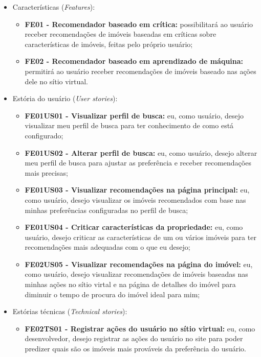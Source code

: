 \begin{itemize}
    \item Características (\textit{Features}):
    \begin{itemize}
        \item \textbf{FE01 - Recomendador baseado em crítica:} possibilitará ao usuário receber recomendações de imóveis baseadas em críticas sobre características de imóveis, feitas pelo próprio usuário;

        \item \textbf{FE02 - Recomendador baseado em aprendizado de máquina:} permitirá ao usuário receber recomendações de imóveis baseado nas ações dele no sítio virtual.
    \end{itemize}
    
    \item Estória do usuário (\textit{User stories}):
    \begin{itemize}
        \item \textbf{FE01US01 - Visualizar perfil de busca:} eu, como usuário, desejo visualizar meu perfil de busca para ter conhecimento de como está configurado;
        
        \item \textbf{FE01US02 - Alterar perfil de busca:} eu, como usuário, desejo alterar meu perfil de busca para ajustar as preferência e receber recomendações mais precisas;
        
        \item \textbf{FE01US03 - Visualizar recomendações na página principal:} eu, como usuário, desejo visualizar os imóveis recomendados com base nas minhas preferências configuradas no perfil de busca;
        
        \item \textbf{FE01US04 - Criticar características da propriedade:} eu, como usuário, desejo criticar as características de um ou vários imóveis para ter recomendações mais adequadas com o que eu desejo;
        
        \item \textbf{FE02US05 - Visualizar recomendações na página do imóvel:} eu, como usuário, desejo visualizar recomendações de imóveis baseadas nas minhas ações no sítio virtal e na página de detalhes do imóvel para diminuir o tempo de procura do imóvel ideal para mim;
    \end{itemize}
    
    \item Estórias técnicas (\textit{Technical stories}):
    \begin{itemize}
        \item \textbf{FE02TS01 - Registrar ações do usuário no sítio virtual:} eu, como desenvolvedor, desejo registrar as ações do usuário no site para poder predizer quais são os imóveis mais prováveis da preferência do usuário.
    \end{itemize}
\end{itemize}

